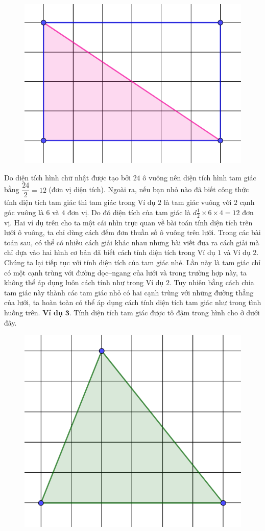 \begin{multicols}{2}
\begin{figure}[H]
		\centering
		\vspace*{-5pt}
		\captionsetup{labelformat= empty, justification=centering}
		\includegraphics[width=0.55\linewidth]{4}
		\vspace*{-10pt}
	\end{figure}
	Do diện tích hình chữ nhật được tạo bởi $24$ ô vuông nên diện tích hình tam giác bằng $\dfrac{24}{2} =12$ (đơn vị diện tích).
	\vskip 0.1cm
	Ngoài ra, nếu bạn nhỏ nào đã biết công thức tính diện tích tam giác thì tam giác trong Ví dụ $2$ là tam giác vuông với $2$ cạnh góc vuông là $6$ và $4$ đơn vị. Do đó diện tích của tam giác là $d\frac{1}{2}\times 6\times 4 = 12$ đơn vị.
	\vskip 0.1cm
	Hai ví dụ trên cho ta một cái nhìn trực quan về bài toán tính diện tích trên lưới ô vuông, ta chỉ dùng cách đếm đơn thuần số ô vuông trên lưới. Trong các bài toán sau, có thể có nhiều cách giải khác nhau nhưng bài viết đưa ra cách giải mà chỉ dựa vào hai hình cơ bản đã biết cách tính diện tích trong Ví dụ $1$ và Ví dụ $2$.
	\vskip 0.1cm
	Chúng ta lại tiếp tục với tính diện tích của tam giác nhé. Lần này là tam giác chỉ có một cạnh trùng với đường dọc--ngang của lưới và trong trường hợp này, ta không thể áp dụng luôn cách tính như trong Ví dụ $2$. Tuy nhiên bằng cách chia tam giác này thành các tam giác nhỏ có hai cạnh trùng với những đường thẳng của lưới, ta hoàn toàn có thể áp dụng cách tính diện tích tam giác như trong tình huống trên.
	\vskip 0.1cm
	\textbf{\color{toancuabi}Ví dụ} $\pmb{3.}$ Tính diện tích tam giác được tô đậm trong hình cho ở dưới đây.
	\begin{figure}[H]
		\centering
		\vspace*{-5pt}
		\captionsetup{labelformat= empty, justification=centering}
		\includegraphics[width=0.55\linewidth]{5}

\end{figure}
\end{multicols}
